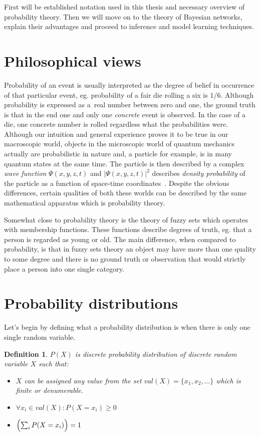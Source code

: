 \documentclass[english,cover]{fitthesis} %
\newtheorem{math_def}{Definition}[chapter] %
\newcommand{\term}[1]{\emph{#1}}           %
\begin{document}
First will be established notation used in this thesis and necessary overview of probability theory. Then we will move on to the theory of Bayesian networks, explain their advantages and proceed to inference and model learning techniques.



\section{Philosophical views}
Probability of an event is usually interpreted as the degree of belief in occurrence of that particular event, eg. probability of a fair die rolling a six is $1/6$. Although probability is expressed as a~real number between zero and one, the ground truth is that in the end one and only one \emph{concrete} event is observed. In the case of a die, one concrete number is rolled regardless what the probabilities were. Although our intuition and general experience proves it to be true in our macroscopic world, objects in the microscopic world of quantum mechanics actually are probabilistic in nature and, a particle for example, is in many quantum states at the same time. The particle is then described by a complex \term{wave function} $\Psi(x,y,z,t)$ and $\vert\Psi(x,y,z,t)\vert^2$ describes \term{density probability} of the particle as a function of space-time coordinates~\cite[p.~1044]{hrw_physics}. Despite the obvious differences, certain qualities of both these worlds can be described by the same mathematical apparatus which is probability theory.

Somewhat close to probability theory is the theory of fuzzy sets which operates with membership functions. These functions describe degrees of truth, eg. that a person is regarded as young or old. The main difference, when compared to probability, is that in fuzzy sets theory an object may have more than one quality to some degree and there is no ground truth or observation that would strictly place a person into one single category.


\section{Probability distributions}
Let's begin by defining what a probability distribution is when there is only one single random variable.
\begin{math_def}\label{def_prob_distribution}
    $P(X)$ is discrete probability distribution of discrete random variable $X$ such that:
    \begin{itemize}
        \item $X$ can be assigned any value from the set $val(X) = \lbrace x_1, x_2, \dots \rbrace$ which is finite or denumerable.
        \item $\forall x_i \in val(X): P(X = x_i) \geq 0$
        \item $\Bigl( \sum_i P(X = x_i) \Bigr) = 1$
    \end{itemize}
\end{math_def}
\end{document}
